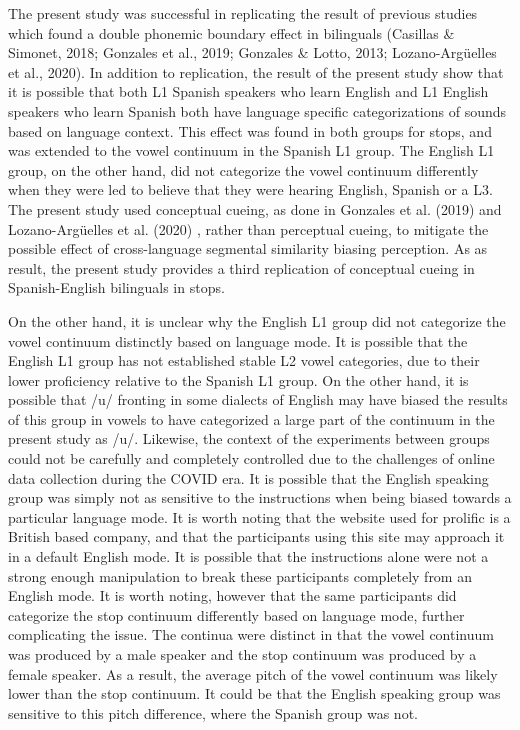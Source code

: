 \documentclass[
  man]{apa6}
\begin{document}
The present study was successful in replicating the result of previous studies which found a double phonemic boundary effect in bilinguals (Casillas \& Simonet, 2018; Gonzales et al., 2019; Gonzales \& Lotto, 2013; Lozano-Argüelles et al., 2020). In addition to replication, the result of the present study show that it is possible that both L1 Spanish speakers who learn English and L1 English speakers who learn Spanish both have language specific categorizations of sounds based on language context. This effect was found in both groups for stops, and was extended to the vowel continuum in the Spanish L1 group. The English L1 group, on the other hand, did not categorize the vowel continuum differently when they were led to believe that they were hearing English, Spanish or a L3.
The present study used conceptual cueing, as done in Gonzales et al. (2019) and Lozano-Argüelles et al. (2020) , rather than perceptual cueing, to mitigate the possible effect of cross-language segmental similarity biasing perception. As as result, the present study provides a third replication of conceptual cueing in Spanish-English bilinguals in stops.

On the other hand, it is unclear why the English L1 group did not categorize the vowel continuum distinctly based on language mode. It is possible that the English L1 group has not established stable L2 vowel categories, due to their lower proficiency relative to the Spanish L1 group. On the other hand, it is possible that /u/ fronting in some dialects of English may have biased the results of this group in vowels to have categorized a large part of the continuum in the present study as /u/. Likewise, the context of the experiments between groups could not be carefully and completely controlled due to the challenges of online data collection during the COVID era. It is possible that the English speaking group was simply not as sensitive to the instructions when being biased towards a particular language mode. It is worth noting that the website used for prolific is a British based company, and that the participants using this site may approach it in a default English mode. It is possible that the instructions alone were not a strong enough manipulation to break these participants completely from an English mode. It is worth noting, however that the same participants did categorize the stop continuum differently based on language mode, further complicating the issue. The continua were distinct in that the vowel continuum was produced by a male speaker and the stop continuum was produced by a female speaker. As a result, the average pitch of the vowel continuum was likely lower than the stop continuum. It could be that the English speaking group was sensitive to this pitch difference, where the Spanish group was not.
\end{document}
